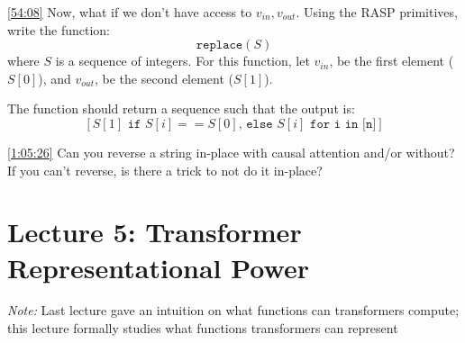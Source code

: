 \documentclass[12pt, twoside]{article}
\begin{document}
\begin{exercise} \label{ex:3.2}\href{https://youtu.be/2MRAX8EdBA8?si=oSIV4BYVMGFX85G-&t=3243}{[54:08]}
Now, what if we don't have access to $v_{in}, v_{out}$. Using the RASP primitives, write the function:
$$ \texttt{replace}(S) $$
where $S$ is a sequence of integers. For this function, let $v_{in}$, be the first element ($S[0]$), and $v_{out}$, be the second element ($S[1]$).

The function should return a sequence such that the output is:
$$ [S[1] \texttt{ if } S[i] == S[0]\texttt{, else } S[i] \texttt{ for i in [n]}] $$
\end{exercise}

\begin{exercise} \label{ex:3.3}\href{https://youtu.be/2MRAX8EdBA8?si=QGFYtKdnMASlIUWs}{[1:05:26]} Can you reverse a string in-place with causal attention and/or without? If you can't reverse, is there a trick to not do it in-place?

\end{exercise}

\newpage


\thispagestyle{RemoveHeader}


\section*{Lecture 5: Transformer Representational Power}

\textit{Note:} Last lecture gave an intuition on what functions can transformers compute; this lecture formally studies what functions transformers can represent
\end{document}
